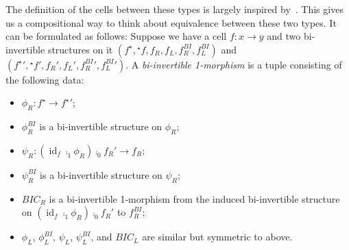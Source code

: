 \documentclass[draft]{article}
\DeclareMathOperator{\id}{id}
\newcommand{\linv}[1]{{}^\star\!#1} \newcommand{\rinv}[1]{#1^\star}
\begin{document}
The definition of the cells between these types is largely inspired
by~\cite[Lemma 4.2.5]{hottbook}. This gives us a compositional way to
think about equivalence between these two types. It can be formulated
as follows: Suppose we have a cell \(f : x \to y\) and two
bi-invertible structures on it \((\rinv f, \linv f, f_R, f_L,
f_R^{BI}, f_L^{BI})\) and \((\rinv f{}' , \linv f{}', f_R', f_L',
f_R^{BI}{}', f_L^{BI}{}')\). A \emph{bi-invertible 1-morphism} is a tuple
consisting of the following data:
\begin{itemize}
\item \(\phi_R : \rinv f \to \rinv f{}'\);
\item \(\phi_R^{BI}\) is a bi-invertible structure on \(\phi_R\);
\item \(\psi_R : (\id_f \comp_1 \phi_R) \comp_0 f_R' \to f_R\);
\item \(\psi_R^{BI}\) is a bi-invertible structure on \(\psi_R\);
\item \(BIC_R\) is a bi-invertible 1-morphism from the induced bi-invertible structure on
  \((\id_f \comp_1 \phi_R) \comp_0 f_R'\) to \(f_R^{BI}\);
\item \(\phi_L\), \(\phi_L^{BI}\), \(\psi_L\), \(\psi_L^{BI}\), and
  \(BIC_L\) are similar but symmetric to above.
\end{itemize}
\end{document}
